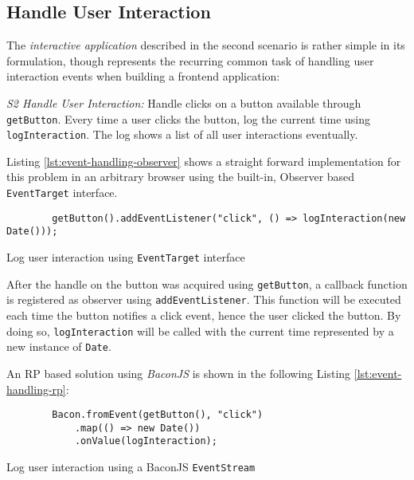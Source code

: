 \documentclass[12pt,a4paper]{article}
\begin{document}
\subsection{Handle User Interaction}

The \emph{interactive application} \cite{7827078} described in the second scenario is rather simple in its formulation, though represents the recurring common task of handling user interaction events when building a frontend application:

\begin{framed}
	\noindent\emph{S2 Handle User Interaction:} Handle clicks on a button available through \texttt{getButton}. Every time a user clicks the button, log the current time using \texttt{logInteraction}. The log shows a list of all user interactions eventually.
\end{framed}

Listing \ref{lst:event-handling-observer} shows a straight forward implementation for this problem in an arbitrary browser using the built-in, Observer based \texttt{EventTarget} interface.

\begin{listing}[ht]
	\begin{verbatim}
		getButton().addEventListener("click", () => logInteraction(new Date()));
	\end{verbatim}
	\caption{Log user interaction using \texttt{EventTarget} interface}
	\label{lst:event-handling-observer}
\end{listing}

After the handle on the button was acquired using \texttt{getButton}, a callback function is registered as observer using \texttt{addEventListener}. This function will be executed each time the button notifies a click event, hence the user clicked the button. By doing so, \texttt{logInteraction} will be called with the current time represented by a new instance of \texttt{Date}.

An RP based solution using \emph{BaconJS} is shown in the following Listing \ref{lst:event-handling-rp}:

\begin{listing}[H]
	\begin{verbatim}
		Bacon.fromEvent(getButton(), "click")
			.map(() => new Date())
			.onValue(logInteraction);
	\end{verbatim}
	\caption{Log user interaction using a BaconJS \texttt{EventStream}}
	\label{lst:event-handling-rp}
\end{listing}
\end{document}
